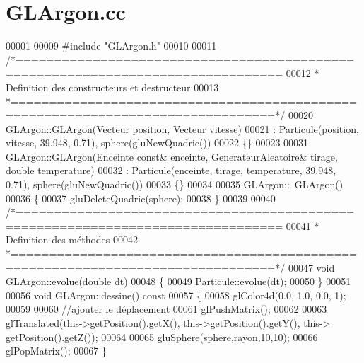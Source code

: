 \section{G\+L\+Argon.\+cc}
\label{_g_l_argon_8cc_source}

\begin{DoxyCode}
00001 
00009 \textcolor{preprocessor}{#include "GLArgon.h"}
00010 
00011 \textcolor{comment}{/*================================================================================}
00012 \textcolor{comment}{ * Definition des constructeurs et destructeur}
00013 \textcolor{comment}{ *================================================================================*/}
00020 GLArgon::GLArgon(Vecteur position, Vecteur vitesse)
00021  : Particule(position, vitesse, 39.948, 0.71), sphere(gluNewQuadric())
00022 \{\}
00023 
00031 GLArgon::GLArgon(Enceinte \textcolor{keyword}{const}& enceinte, GenerateurAleatoire& tirage, \textcolor{keywordtype}{double} temperature)
00032  : Particule(enceinte, tirage, temperature, 39.948, 0.71), sphere(gluNewQuadric())
00033 \{\}
00034 
00035 GLArgon::~GLArgon() 
00036 \{ 
00037     gluDeleteQuadric(sphere); 
00038 \}
00039 
00040 \textcolor{comment}{/*================================================================================}
00041 \textcolor{comment}{ * Definition des méthodes }
00042 \textcolor{comment}{ *================================================================================*/}
00047 \textcolor{keywordtype}{void} GLArgon::evolue(\textcolor{keywordtype}{double} dt)
00048 \{
00049     Particule::evolue(dt);
00050 \}
00051 
00056 \textcolor{keywordtype}{void} GLArgon::dessine()\textcolor{keyword}{ const}
00057 \textcolor{keyword}{}\{   
00058     glColor4d(0.0, 1.0, 0.0, 1); 
00059 
00060     \textcolor{comment}{//ajouter le déplacement}
00061     glPushMatrix();
00062     
00063     glTranslated(this->getPosition().getX(), this->getPosition().getY(), this->
      getPosition().getZ());
00064     
00065     gluSphere(sphere,rayon,10,10);
00066     glPopMatrix();
00067 \}
\end{DoxyCode}
